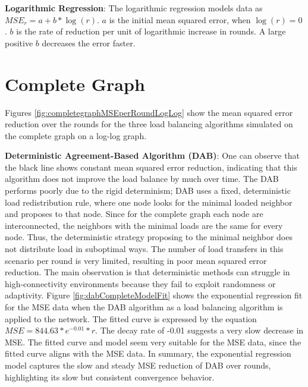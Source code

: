 \textbf{Logarithmic Regression}: The logarithmic regression models data as $MSE_r=a+b*\log{(r)}$. $a$ is the initial mean squared error, when $\log{(r)}=0$. $b$ is the rate of reduction per unit of logarithmic increase in rounds. A large positive $b$ decreases the error faster.


\section{Complete Graph}\label{sec:completeGraph}
Figures \ref{fig:completegraphMSEperRoundLogLog} show the mean squared error reduction over the rounds for the three load balancing algorithms simulated on the complete graph on a log-log graph.


\textbf{Deterministic Agreement-Based Algorithm (DAB)}: One can observe that the black line shows constant mean squared error reduction, indicating that this algorithm does not improve the load balance by much over time. The DAB performs poorly due to the rigid determinism; DAB uses a fixed, deterministic load redistribution rule, where one node looks for the minimal loaded neighbor and proposes to that node. Since for the complete graph each node are interconnected, the neighbors with the minimal loads are the same for every node. Thus, the deterministic strategy proposing to the minimal neighbor does not distribute load in suboptimal ways. The number of load transfers in this scenario per round is very limited, resulting in poor mean squared error reduction. The main observation is that deterministic methods can struggle in high-connectivity environments because they fail to exploit randomness or adaptivity. Figure \ref{fig:dabCompleteModelFit} shows the exponential regression fit for the MSE data when the DAB algorithm as a load balancing algorithm is applied to the network. The fitted curve is expressed by the equation $MSE=844.63*e^{-0.01}*r$. The decay rate of -0.01 suggests a very slow decrease in MSE. The fitted curve and model seem very suitable for the MSE data, since the fitted curve aligns with the MSE data. In summary, the exponential regression model captures the slow and steady MSE reduction of DAB over rounds, highlighting its slow but consistent convergence behavior.

